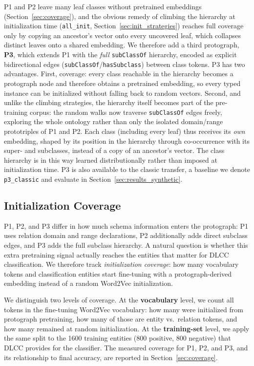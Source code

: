 \documentclass[a4paper,oneside,bibliography=totoc]{scrbook}
\begin{document}
P1 and P2 leave many leaf classes without pretrained embeddings
(Section~\ref{sec:coverage}), and the obvious remedy of climbing the hierarchy
at initialization time (\texttt{all\_init}, Section~\ref{sec:init_strategies})
reaches full coverage only by copying an ancestor's vector onto every uncovered
leaf, which collapses distinct leaves onto a shared embedding. We therefore add
a third protograph, \textbf{P3}, which extends P1 with the \emph{full}
\texttt{subClassOf} hierarchy, encoded as explicit bidirectional edges
(\texttt{subClassOf}/\texttt{hasSubclass}) between class tokens. P3 has two
advantages. First, coverage: every class reachable in the hierarchy becomes a
protograph node and therefore obtains a pretrained embedding, so every typed
instance can be initialized without falling back to random vectors. Second, and
unlike the climbing strategies, the hierarchy itself becomes part of the
pre-training corpus: the random walks now traverse \texttt{subClassOf} edges
freely, exploring the whole ontology rather than only the isolated
domain/range prototriples of P1 and P2. Each class (including every
leaf) thus receives its \emph{own} embedding, shaped by its position in the
hierarchy through co-occurrence with its super- and subclasses, instead of a
copy of an ancestor's vector. The class hierarchy is in this way learned
distributionally rather than imposed at initialization time. P3 is also
available to the classic transfer, a baseline we denote \texttt{p3\_classic} and
evaluate in Section~\ref{sec:results_synthetic}.

\subsection{Initialization Coverage}
\label{sec:coverage_concept}

P1, P2, and P3 differ in how much schema information enters the protograph: P1
uses relation domain and range declarations, P2 additionally adds direct
subclass edges, and P3 adds the full subclass hierarchy. A natural question is
whether this extra pretraining signal actually reaches the entities that matter
for DLCC classification. We therefore track \emph{initialization coverage}: how
many vocabulary tokens and classification entities start fine-tuning with a
protograph-derived embedding instead of a random Word2Vec initialization.

We distinguish two levels of coverage. At the \textbf{vocabulary} level, we
count all tokens in the fine-tuning Word2Vec vocabulary: how many were
initialized from protograph pretraining, how many of
those are entity vs.\ relation tokens, and how many remained at random
initialization. At the \textbf{training-set} level, we apply the same
split to the 1600 training entities (800 positive, 800 negative) that DLCC
provides for the classifier. The measured coverage for P1, P2, and P3, and its
relationship to final accuracy, are reported in Section~\ref{sec:coverage}.
\end{document}
